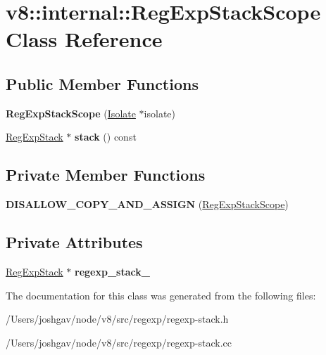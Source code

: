 \hypertarget{classv8_1_1internal_1_1_reg_exp_stack_scope}{}\section{v8\+:\+:internal\+:\+:Reg\+Exp\+Stack\+Scope Class Reference}
\label{classv8_1_1internal_1_1_reg_exp_stack_scope}
\subsection*{Public Member Functions}
\begin{DoxyCompactItemize}
\item 
{\bfseries Reg\+Exp\+Stack\+Scope} (\hyperlink{classv8_1_1internal_1_1_isolate}{Isolate} $\ast$isolate)\hypertarget{classv8_1_1internal_1_1_reg_exp_stack_scope_a7c5e8546faa6a48c189159dd7573d068}{}\label{classv8_1_1internal_1_1_reg_exp_stack_scope_a7c5e8546faa6a48c189159dd7573d068}

\item 
\hyperlink{classv8_1_1internal_1_1_reg_exp_stack}{Reg\+Exp\+Stack} $\ast$ {\bfseries stack} () const \hypertarget{classv8_1_1internal_1_1_reg_exp_stack_scope_aa1c0c3dbc2641b5aac3c7a15cb292c7f}{}\label{classv8_1_1internal_1_1_reg_exp_stack_scope_aa1c0c3dbc2641b5aac3c7a15cb292c7f}

\end{DoxyCompactItemize}
\subsection*{Private Member Functions}
\begin{DoxyCompactItemize}
\item 
{\bfseries D\+I\+S\+A\+L\+L\+O\+W\+\_\+\+C\+O\+P\+Y\+\_\+\+A\+N\+D\+\_\+\+A\+S\+S\+I\+GN} (\hyperlink{classv8_1_1internal_1_1_reg_exp_stack_scope}{Reg\+Exp\+Stack\+Scope})\hypertarget{classv8_1_1internal_1_1_reg_exp_stack_scope_a70e7dfb192c8a1244bd0797d3eab9e7b}{}\label{classv8_1_1internal_1_1_reg_exp_stack_scope_a70e7dfb192c8a1244bd0797d3eab9e7b}

\end{DoxyCompactItemize}
\subsection*{Private Attributes}
\begin{DoxyCompactItemize}
\item 
\hyperlink{classv8_1_1internal_1_1_reg_exp_stack}{Reg\+Exp\+Stack} $\ast$ {\bfseries regexp\+\_\+stack\+\_\+}\hypertarget{classv8_1_1internal_1_1_reg_exp_stack_scope_a6b3106a83633a3fc4f346f3be1fc9294}{}\label{classv8_1_1internal_1_1_reg_exp_stack_scope_a6b3106a83633a3fc4f346f3be1fc9294}

\end{DoxyCompactItemize}


The documentation for this class was generated from the following files\+:\begin{DoxyCompactItemize}
\item 
/\+Users/joshgav/node/v8/src/regexp/regexp-\/stack.\+h\item 
/\+Users/joshgav/node/v8/src/regexp/regexp-\/stack.\+cc\end{DoxyCompactItemize}
